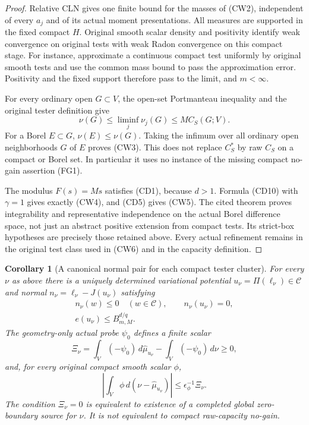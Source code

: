 \documentclass[11pt,a4paper]{article}
\numberwithin{equation}{section}
\newtheorem{corollary}[theorem]{Corollary}
\theoremstyle{definition}
\theoremstyle{remark}
\begin{document}
\begin{proof}
Relative CLN gives one finite bound for the masses of (CW2),
independent of every $a_j$ and of its actual moment presentations.
All measures are supported in the fixed compact $H$. Original
smooth scalar density and positivity identify weak convergence
on original tests with weak Radon convergence on this compact
stage. For instance, approximate a continuous compact test
uniformly by original smooth tests and use the common mass bound
to pass the approximation error. Positivity and the fixed support
therefore pass to the limit, and $m<\infty$.

For every ordinary open $G\subset V$, the open-set Portmanteau
inequality and the original tester definition give
\[
    \nu(G)\leq\liminf_j\nu_j(G)
        \leq M C_S(G;V).
 \tag{CW6}
\]
For a Borel $E\subset G$, $\nu(E)\leq\nu(G)$.
Taking the infimum over all ordinary open neighborhoods $G$
of $E$ proves (CW3). This does not replace $C_S^*$ by raw
$C_S$ on a compact or Borel set. In particular it uses no
instance of the missing compact no-gain assertion (FG1).

The modulus $F(s)=Ms$ satisfies (CD1), because
$d>1$. Formula (CD10) with $\gamma=1$ gives exactly (CW4),
and (CD5) gives (CW5). The cited theorem proves integrability
and representative independence on the actual Borel difference
space, not just an abstract positive extension from compact
tests. Its strict-box hypotheses are precisely those retained
above. Every actual refinement remains in the original test
class used in (CW6) and in the capacity definition.
\end{proof}

\begin{corollary}[A canonical normal pair for each compact tester cluster]
\label{cor:r12-cluster-normal-pair}
For every $\nu$ as above there is a uniquely determined
variational potential $u_\nu=\Pi(\ell_\nu)\in\mathscr C$ and
normal $n_\nu=\ell_\nu-J(u_\nu)$ satisfying
\[
 \begin{gathered}
 n_\nu(w)\leq0\quad(w\in\mathscr C),\qquad n_\nu(u_\nu)=0,\\
                  e(u_\nu)\leq B_{m,M}^{d/q}.
 \end{gathered}
 \tag{CW7}
\]
The geometry-only actual probe $\psi_0$ defines a finite scalar
\[
 \Xi_\nu=\int_V(-\psi_0)\,d\widehat\mu_{u_\nu}
                       -\int_V(-\psi_0)\,d\nu\geq0,
 \tag{CW8}
\]
and, for every original compact smooth scalar $\phi$,
\[
 \left|\int_V\phi\,d(\nu-\widehat\mu_{u_\nu})\right|
                   \leq\epsilon_\phi^{-1}\Xi_\nu.
 \tag{CW9}
\]
The condition $\Xi_\nu=0$ is equivalent to existence of a
\emph{completed global zero-boundary source} for $\nu$.
It is not equivalent to compact raw-capacity no-gain.
\end{corollary}
\end{document}
